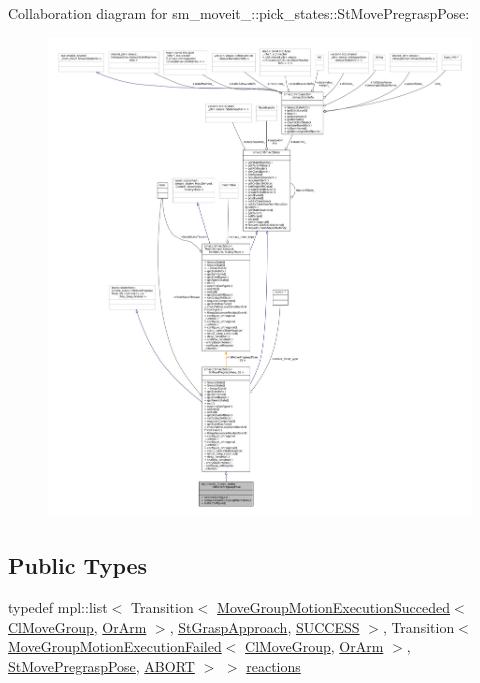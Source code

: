 Collaboration diagram for sm\+\_\+moveit\+\_\+:\+:pick\+\_\+states\+:\+:St\+Move\+Pregrasp\+Pose\+:
\nopagebreak
\begin{figure}[H]
\begin{center}
\leavevmode
\includegraphics[width=350pt]{structsm__moveit__3_1_1pick__states_1_1StMovePregraspPose__coll__graph}
\end{center}
\end{figure}
\subsection*{Public Types}
\begin{DoxyCompactItemize}
\item 
typedef mpl\+::list$<$ Transition$<$ \hyperlink{structmove__group__interface__client_1_1MoveGroupMotionExecutionSucceded}{Move\+Group\+Motion\+Execution\+Succeded}$<$ \hyperlink{classmove__group__interface__client_1_1ClMoveGroup}{Cl\+Move\+Group}, \hyperlink{classsm__moveit__3_1_1OrArm}{Or\+Arm} $>$, \hyperlink{structsm__moveit__3_1_1pick__states_1_1StGraspApproach}{St\+Grasp\+Approach}, \hyperlink{classSUCCESS}{S\+U\+C\+C\+E\+SS} $>$, Transition$<$ \hyperlink{structmove__group__interface__client_1_1MoveGroupMotionExecutionFailed}{Move\+Group\+Motion\+Execution\+Failed}$<$ \hyperlink{classmove__group__interface__client_1_1ClMoveGroup}{Cl\+Move\+Group}, \hyperlink{classsm__moveit__3_1_1OrArm}{Or\+Arm} $>$, \hyperlink{structsm__moveit__3_1_1pick__states_1_1StMovePregraspPose}{St\+Move\+Pregrasp\+Pose}, \hyperlink{classABORT}{A\+B\+O\+RT} $>$ $>$ \hyperlink{structsm__moveit__3_1_1pick__states_1_1StMovePregraspPose_a97718c3b3ef152ea2703c7fb5eb9c416}{reactions}
\end{DoxyCompactItemize}
